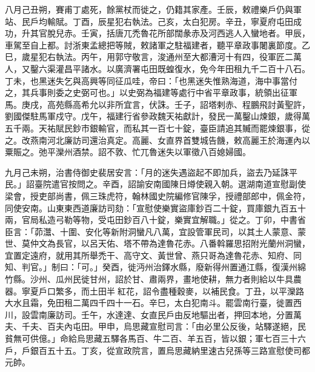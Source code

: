 \begin{pinyinscope}
 八月己丑朔，賽甫丁處死，餘黨杖而徙之，仍籍其家產。壬辰，敕禮樂戶仍與軍站、民戶均輸賦。丁酉，辰星犯右執法。己亥，太白犯房。辛丑，寧夏府屯田成功，升其官脫兒赤。壬寅，括唐兀禿魯花所部闊彖赤及河西逃人入蠻地者。甲辰，車駕至自上都。討浙東孟總把等賊，敕諸軍之駐福建者，聽平章政事闍裏節度。乙巳，歲星犯右執法。丙午，用郭守敬言，浚通州至大都漕河十有四，役軍匠二萬人，又鑿六渠灌昌平諸水。以廣濟署屯田既蝗復水，免今年田租九千二百十八石。丁未，也黑迷失乞與高興等同征瓜哇，帝曰：「也黑迷失惟熟海道，海中事當付之，其兵事則委之史弼可也。」以史弼為福建等處行中省平章政事，統領出征軍馬。庚戌，高苑縣高希允以非所宜言，伏誅。壬子，詔塔剌赤、程鵬飛討黃聖許，劉國傑駐馬軍戍守。戊午，福建行省參政魏天祐獻計，發民一萬鑿山煉銀，歲得萬五千兩。天祐賦民鈔市銀輸官，而私其一百七十錠，臺臣請追其贓而罷煉銀事，從之。改燕南河北廉訪司還治真定。高麗、女直界首雙城告饑，敕高麗王於海運內以粟賑之。弛平灤州酒禁。詔不敦、忙兀魯迷失以軍徵八百媳婦國。



 九月己未朔，治書侍御史裴居安言：「月的迷失遇盜起不即加兵，盜去乃延誅平民。」詔臺院遣官按問之。辛酉，詔諭安南國陳日燇使親入朝。選湖南道宣慰副使梁會，授吏部尚書，佩三珠虎符，翰林國史院編修官陳孚，授禮部郎中，佩金符，同使安南。山東東西道廉訪司劾：「宣慰使樂實盜庫鈔百二十錠，買庫銀九百五十兩，官局私造弓勒等物，受屯田鈔百八十錠，樂實宜解職。」從之。丁卯，中書省臣言：「茆灊、十圍、安化等新附洞蠻凡八萬，宜設管軍民司，以其土人蒙意、蒙世、莫仲文為長官，以呂天佑、塔不帶為達魯花赤。八番斡羅思招附光蘭州洞蠻，宜置定遠府，就用其所舉禿干、高守文、黃世曾、燕只哥為達魯花赤、知府、同知、判官。」制曰：「可。」癸酉，徙沔州治鐸水縣，廢新得州置通江縣，復漢州綿竹縣。沙州、瓜州民徙甘州，詔於甘、肅兩界，畫地使耕，無力者則給以牛具農器。寧夏戶口繁多，而土田半紅花，詔令盡種穀麥，以補民食。丁丑，以平灤路大水且霜，免田租二萬四千四十一石。辛巳，太白犯南斗。罷雲南行臺，徙置西川，設雲南廉訪司。壬午，水達達、女直民戶由反地驅出者，押回本地，分置萬夫、千夫、百夫內屯田。甲申，烏思藏宣慰司言：「由必里公反後，站驛遂絕，民貧無可供億。」命給烏思藏五驛各馬百、牛二百、羊五百，皆以銀；軍七百三十六戶，戶銀百五十五。丁亥，從宣政院言，置烏思藏納里速古兒孫等三路宣慰使司都元帥。




\end{pinyinscope}
